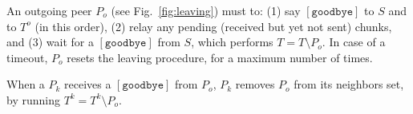 \begin{figure*}
  \caption{Tasks run when an peer $P_o$ wants to leave its
    team. $P_k$ is a neighbor of $P_o$.\label{fig:leaving}}
\end{figure*}
An outgoing peer $P_o$ (see Fig.~\ref{fig:leaving}) must to: (1) say
$[\mathtt{goodbye}]$ to $S$ and to $T^o$ (in this order), (2)
relay any pending (received but yet not sent) chunks, and (3) wait for
a $[\mathtt{goodbye}]$ from $S$, which performs $T = T \setminus
P_o$. In case of a timeout, $P_o$ resets the leaving procedure,
for a maximum number of times.

When a $P_k$ receives a $[\mathtt{goodbye}]$ from $P_o$, $P_k$
removes $P_o$ from its neighbors set, by running $T^k = T^k
\setminus P_o$.
